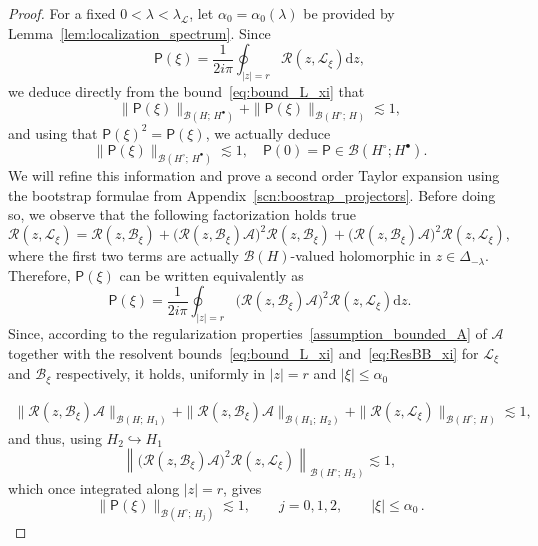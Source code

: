 \documentclass[10pt]{amsart}
\theoremstyle{definition}\newtheorem{defi}[theo]{Definition}\newtheorem{rema}[theo]{Remark}\newtheorem{exam}[theo]{Example}\newtheorem{exem}[theo]{Example}\newtheorem{nota}[theo]{Notation}
\renewcommand{\d}{\mathrm{d}}
\renewcommand{\AA}{\mathcal{A}}
\newcommand{\BB}{\mathcal{B}}
\newcommand{\LL}{\mathcal{L}}
\newcommand{\PP}{\mathsf{P}}
\newcommand{\RR}{\mathcal{R}}
\newcommand{\BBB}{\mathscr{B}}
\newcommand{\Ss}{H}
\newcommand{\Ssp}{H^{\bullet}}
\newcommand{\Ssm}{H^{\circ}}
\renewcommand*\le{\leqslant}
\begin{document}
\begin{proof}
For a fixed $0 < \lambda < \lambda_{\LL}$, let $\alpha_{0}=\alpha_{0}(\lambda)$ be provided by Lemma~\ref{lem:localization_spectrum}. Since
\[
\PP(\xi)=\frac{1}{2i\pi}\oint_{|z|=r}\RR(z,\LL_{\xi}) \d z,
\]
we deduce directly from the bound~\eqref{eq:bound_L_xi} that
\[
\| \PP(\xi) \|_{\BBB(\Ss ;\,\Ssp)} + \| \PP(\xi) \|_{\BBB(\Ssm ;\,\Ss)} \lesssim 1,
\]
and using that $\PP(\xi)^2 = \PP(\xi)$, we actually deduce
\begin{equation}\label{eq:reg_P_xi_order_0}
\| \PP(\xi) \|_{\BBB(\Ssm ;\,\Ssp)} \lesssim 1, \quad \PP(0) = \PP \in \BBB(\Ssm ; \Ssp).
\end{equation}
We will refine this information and prove a second order Taylor expansion using the bootstrap formulae from Appendix~\ref{scn:boostrap_projectors}. Before doing so, we observe that the following factorization holds true
\begin{equation*}
\RR(z,\LL_{\xi}) =\RR(z,\BB_{\xi})+ \big(\RR(z,\BB_{\xi}) \AA \big)^2 \RR(z,\BB_{\xi}) + \big(\RR(z,\BB_{\xi}) \AA \big)^2 \RR(z,\LL_{\xi}),
\end{equation*}
where the first two terms are actually $\BBB(\Ss)$-valued holomorphic in $z \in \Delta_{-\lambda}$. Therefore, $\PP(\xi)$ can be written equivalently as
\[
\PP(\xi)=\frac{1}{2i\pi}\oint_{|z|=r} \big(\RR(z,\BB_{\xi})\AA\big)^{2}\RR(z,\LL_{\xi})\d z.
\]
Since, according to the regularization properties~\eqref{assumption_bounded_A} of $\AA$ together with the resolvent bounds~\eqref{eq:bound_L_xi} and~\eqref{eq:ResBB_xi} for $\LL_\xi$ and $\BB_\xi$ respectively, it holds, uniformly in $|z|=r$ and $| \xi | \le \alpha_0$

\begin{align*}
\| \RR(z, \BB_\xi) \AA \|_{ \BBB(\Ss ;\,\Ss_1) } + \| \RR(z, \BB_\xi) \AA \|_{ \BBB(\Ss_1 ;\,\Ss_2) } + \| \RR(z, \LL_\xi) \|_{ \BBB(\Ssm ;\,\Ss)} \lesssim 1,
\end{align*}
and thus, using $\Ss_{2} \hookrightarrow \Ss_1$
\begin{equation*}
\left\| \big(\RR(z,\BB_{\xi})\AA\big)^{2}\RR(z,\LL_{\xi}) \right\|_{ \BBB(\Ssm ;\,\Ss_2)} \lesssim 1,
\end{equation*}
which once integrated along $| z | = r$, gives
\begin{equation}\label{eq:regularization_P_xi}
\| \PP(\xi) \|_{\BBB(\Ssm ;\,\Ss_{j})} \lesssim 1, \qquad j=0,1,2, \qquad | \xi | \le \alpha_0\,.
\end{equation}



\end{proof}
\end{document}
